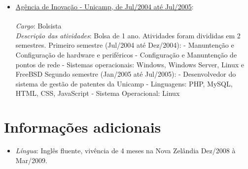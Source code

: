 \documentclass[a4paper,11pt]{article}
\begin{document}
\begin{itemize}
\item \underline{Agência de Inovação - Unicamp, de Jul/2004 até Jul/2005}:\\
{\small \\ 
  \emph{Cargo}: Bolsista\\
  \emph{Descrição das atividades}: Bolsa de 1 ano. Atividades foram divididas em 2 semestres.
  \subitem Primeiro semestre (Jul/2004 até Dez/2004):
	  \subsubitem - Manuntenção e Configuração de hardware e periféricos
	  \subsubitem - Configuração e Manuntenção de pontos de rede
	  \subsubitem - Sistemas operacionais: Windows, Windows Server, Linux e FreeBSD
 \subitem Segundo semestre (Jan/2005 até Jul/2005):
	  \subsubitem - Desenvolvedor do sistema de gestão de patentes da Unicamp
	  \subsubitem - Linguagens: PHP, MySQL, HTML, CSS, JavaScript
	  \subsubitem - Sistema Operacional: Linux\\
}
 
\end{itemize}
\section{Informações adicionais}
\begin{itemize}
\item \emph{Língua}: Inglês fluente, vivência de 4 meses na Nova Zelândia Dez/2008 à Mar/2009.
\end{itemize}
\end{document}
